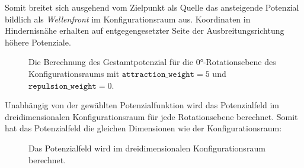 \newpage
Somit breitet sich ausgehend vom Zielpunkt als Quelle das ansteigende Potenzial bildlich als \textit{Wellenfront} im Konfigurationsraum aus.
Koordinaten in Hindernisnähe erhalten auf entgegengesetzter Seite der Ausbreitungsrichtung höhere Potenziale.

\begin{figure}[H]
	\centering
	\footnotesize
	\centerline{}
	\caption{Die Berechnung des Gestamtpotenzial für die $0$°-Rotationsebene des Konfigurationsraums mit $\texttt{attraction\_weight}=5$ und $\texttt{repulsion\_weight}=0$.}
\end{figure}

\vspace*{1cm}
Unabhängig von der gewählten Potenzialfunktion wird das Potenzialfeld im dreidimensionalen Konfigurationsraum für jede Rotationsebene berechnet.
Somit hat das Potenzialfeld die gleichen Dimensionen wie der Konfigurationsraum:

\begin{figure}[H]
	\centering
	\footnotesize
	\centerline{}
	\caption{Das Potenzialfeld wird im dreidimensionalen Konfigurationsraum berechnet.}
\end{figure}


